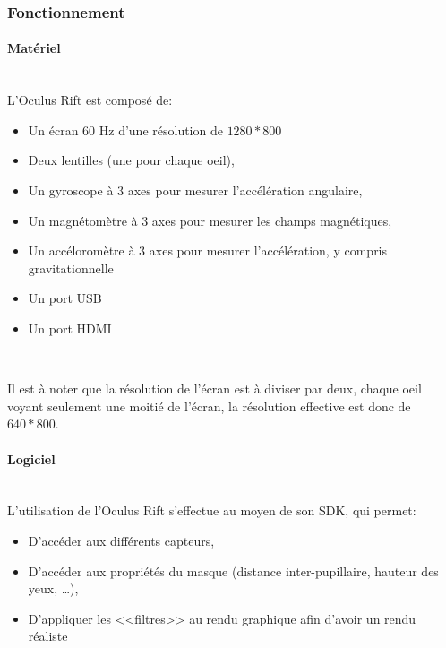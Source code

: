 \documentclass[a4paper,french,12pt]{article}
\begin{document}
		  \subsubsection{Fonctionnement}
		  
			\paragraph{Matériel} ~\\
		    
				L'Oculus Rift est composé de:\\
			      
				\begin{itemize}
				\item Un écran 60 Hz d'une résolution de $1280*800$
				\item Deux lentilles (une pour chaque oeil),
				\item Un gyroscope à 3 axes pour mesurer l'accélération angulaire,
				\item Un magnétomètre à 3 axes pour mesurer les champs magnétiques,
				\item Un accéloromètre à 3 axes pour mesurer l'accélération, y compris gravitationnelle
				\item Un port USB
				\item Un port HDMI
				\end{itemize} ~
			       
				Il est à noter que la résolution de l'écran est à diviser par deux, chaque oeil voyant seulement
				une moitié de l'écran, la résolution effective est donc de $640*800$.
		    
			\paragraph{Logiciel} ~\\
			  
			    L'utilisation de l'Oculus Rift s'effectue au moyen de son SDK, qui permet:\\
			    
			    \begin{itemize}
			     \item D'accéder aux différents capteurs,
			     \item D'accéder aux propriétés du masque (distance inter-pupillaire, hauteur des yeux, \ldots),
			     \item D'appliquer les <<filtres>> au rendu graphique afin d'avoir un rendu réaliste
			    \end{itemize} ~
			    
\end{document}
